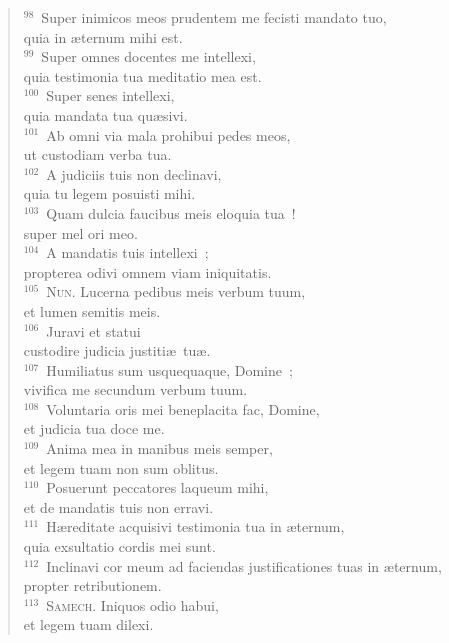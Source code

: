 \begin{verse}
${}^{98}$~Super inimicos meos prudentem me fecisti mandato tuo,\\ quia in \ae ternum mihi est.\\
${}^{99}$~Super omnes docentes me intellexi,\\ quia testimonia tua meditatio mea est.\\
${}^{100}$~Super senes intellexi,\\ quia mandata tua qu\ae sivi.\\
${}^{101}$~Ab omni via mala prohibui pedes meos,\\ ut custodiam verba tua.\\
${}^{102}$~A judiciis tuis non declinavi,\\ quia tu legem posuisti mihi.\\
${}^{103}$~Quam dulcia faucibus meis eloquia tua~!\\ super mel ori meo.\\
${}^{104}$~A mandatis tuis intellexi~;\\ propterea odivi omnem viam iniquitatis.\\
${}^{105}$~\textsc{Nun.} Lucerna pedibus meis verbum tuum,\\ et lumen semitis meis.\\
${}^{106}$~Juravi et statui\\ custodire judicia justiti\ae\ tu\ae .\\
${}^{107}$~Humiliatus sum usquequaque, Domine~;\\ vivifica me secundum verbum tuum.\\
${}^{108}$~Voluntaria oris mei beneplacita fac, Domine,\\ et judicia tua doce me.\\
${}^{109}$~Anima mea in manibus meis semper,\\ et legem tuam non sum oblitus.\\
${}^{110}$~Posuerunt peccatores laqueum mihi,\\ et de mandatis tuis non erravi.\\
${}^{111}$~H\ae reditate acquisivi testimonia tua in \ae ternum,\\ quia exsultatio cordis mei sunt.\\
${}^{112}$~Inclinavi cor meum ad faciendas justificationes tuas in \ae ternum,\\ propter retributionem.\\
${}^{113}$~\textsc{Samech.} Iniquos odio habui,\\ et legem tuam dilexi.\\

\end{verse}
